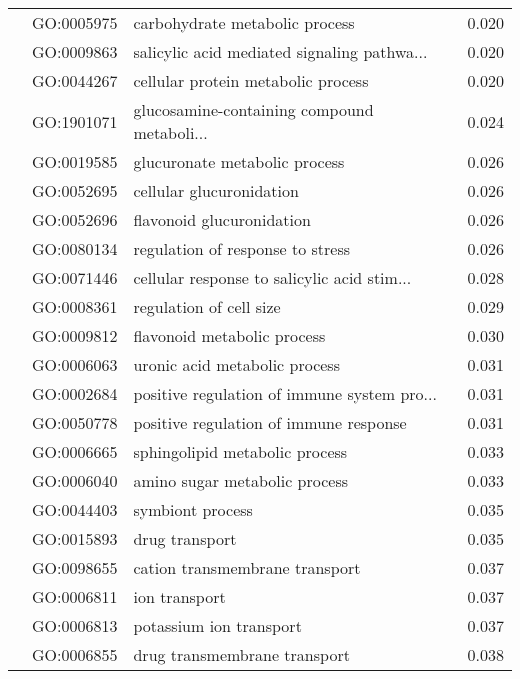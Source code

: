 \begin{longtable}{lllr}
   & GO:0005975 &               carbohydrate metabolic process &         0.020 \\
   & GO:0009863 &  salicylic acid mediated signaling pathwa... &         0.020 \\
   & GO:0044267 &           cellular protein metabolic process &         0.020 \\
   & GO:1901071 &  glucosamine-containing compound metaboli... &         0.024 \\
   & GO:0019585 &                glucuronate metabolic process &         0.026 \\
   & GO:0052695 &                     cellular glucuronidation &         0.026 \\
   & GO:0052696 &                    flavonoid glucuronidation &         0.026 \\
   & GO:0080134 &             regulation of response to stress &         0.026 \\
   & GO:0071446 &  cellular response to salicylic acid stim... &         0.028 \\
   & GO:0008361 &                      regulation of cell size &         0.029 \\
   & GO:0009812 &                  flavonoid metabolic process &         0.030 \\
   & GO:0006063 &                uronic acid metabolic process &         0.031 \\
   & GO:0002684 &  positive regulation of immune system pro... &         0.031 \\
   & GO:0050778 &       positive regulation of immune response &         0.031 \\
   & GO:0006665 &               sphingolipid metabolic process &         0.033 \\
   & GO:0006040 &                amino sugar metabolic process &         0.033 \\
   & GO:0044403 &                             symbiont process &         0.035 \\
   & GO:0015893 &                               drug transport &         0.035 \\
   & GO:0098655 &               cation transmembrane transport &         0.037 \\
   & GO:0006811 &                                ion transport &         0.037 \\
   & GO:0006813 &                      potassium ion transport &         0.037 \\
   & GO:0006855 &                 drug transmembrane transport &         0.038 \\

\end{longtable}
